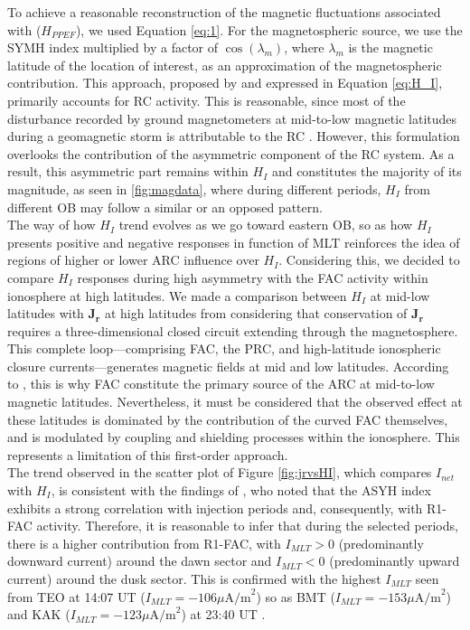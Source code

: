 \documentclass[a4paper]{article}
\theoremstyle{plain}
\theoremstyle{definition}
\begin{document}
	
	
	To achieve a reasonable reconstruction of the magnetic fluctuations associated with ($H_{PPEF}$), we used Equation \ref{eq:1}. For the magnetospheric source, we use the SYMH index multiplied by a factor of $\cos(\lambda_m)$, where $\lambda_m$ is the magnetic latitude of the location of interest, as an approximation of the magnetospheric contribution. This approach, proposed by \cite{ddyn2005} and expressed in Equation \ref{eq:H_I}, primarily accounts for RC activity. This is reasonable, since most of the disturbance recorded by ground magnetometers at mid-to-low magnetic latitudes during a geomagnetic storm is attributable to the RC \citep{Fukushima1973}. However, this formulation overlooks the contribution of the asymmetric component of the RC system. As a result, this asymmetric part remains within $H_I$ and constitutes the majority of its magnitude, as seen in \ref{fig:magdata}, where during different periods, $H_I$ from different OB may follow a similar or an opposed pattern.\\
	
	The way of how $H_I$ trend evolves as we go toward eastern OB, so as how $H_I$ presents positive and negative responses in function of MLT reinforces the idea of regions of higher or lower ARC influence over $H_I$. Considering this, we decided to compare $H_I$ responses during high asymmetry with the FAC activity within ionosphere at high latitudes. We made a comparison between $H_I$ at mid-low latitudes with $\mathbf{J_r}$ at high latitudes from considering that conservation of $\mathbf{J_r}$ requires a three-dimensional closed circuit extending through the magnetosphere. This complete loop—comprising FAC, the PRC, and high-latitude ionospheric closure currents—generates magnetic fields at mid and low latitudes. According to \cite{Fukushima1973}, this is why FAC constitute the primary source of the ARC at mid-to-low magnetic latitudes. Nevertheless, it must be considered that the observed effect at these latitudes is dominated by the contribution of the curved FAC themselves, and is modulated by coupling and shielding processes within the ionosphere. This represents a limitation of this first-order approach.\\
	
	The trend observed in the scatter plot of Figure \ref{fig:jrvsHI}, which compares $I_{net}$ with $H_I$, is consistent with the findings of \cite{Iyemori1990}, who noted that the ASYH index exhibits a strong correlation with injection periods and, consequently, with R1-FAC activity. Therefore, it is reasonable to infer that during the selected periods, there is a higher contribution from R1-FAC, with $I_{MLT} > 0$ (predominantly downward current) around the dawn sector and $I_{MLT} < 0$ (predominantly upward current) around the dusk sector. This is confirmed with the highest $I_{MLT}$ seen from TEO at 14:07 UT ($I_{MLT} = -106 \mu\text{A/m}^2 $) so as BMT ($I_{MLT} = -153 \mu\text{A/m}^2$) and KAK ($I_{MLT} = -123 \mu\text{A/m}^2$) at 23:40 UT .\\
	
\end{document}
